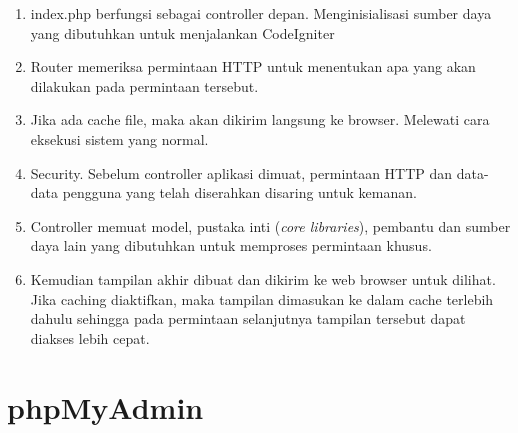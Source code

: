 \begin{enumerate}
		\item index.php berfungsi sebagai controller depan. Menginisialisasi sumber daya yang dibutuhkan untuk menjalankan CodeIgniter
		\item Router memeriksa permintaan HTTP untuk menentukan apa yang akan dilakukan pada permintaan tersebut.
		\item Jika ada cache file, maka akan dikirim langsung ke browser. Melewati cara eksekusi sistem yang normal.
		\item Security. Sebelum controller aplikasi dimuat, permintaan HTTP dan data-data pengguna yang telah diserahkan disaring untuk kemanan.
		\item Controller memuat model, pustaka inti (\textit{core libraries}), pembantu dan sumber daya lain yang dibutuhkan untuk memproses permintaan khusus.
		\item Kemudian tampilan akhir dibuat dan dikirim ke web browser untuk dilihat. Jika caching diaktifkan, maka tampilan dimasukan ke dalam cache terlebih dahulu sehingga pada permintaan selanjutnya tampilan tersebut dapat diakses lebih cepat.
	\end{enumerate}

\section{phpMyAdmin}

